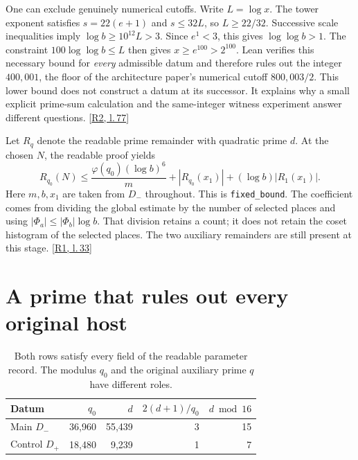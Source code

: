 \documentclass[12pt,letterpaper]{article}
\newcommand{\id}[1]{{\small\nolinkurl{#1}}}
\begin{document}
One can exclude genuinely numerical cutoffs. Write $L=\log x$. The tower exponent satisfies $s=22(e+1)$ and $s\le32L$, so $L\ge22/32$. Successive scale inequalities imply $\log b\ge10^{12}L>3$. Since $e^1<3$, this gives $\log\log b>1$. The constraint $100\log\log b\le L$ then gives $x\ge e^{100}>2^{100}$. Lean verifies this necessary bound for \emph{every} admissible datum and therefore rules out the integer $400{,}001$, the floor of the architecture paper’s numerical cutoff $800{,}003/2$. This lower bound does not construct a datum at its successor. It explains why a small explicit prime-sum calculation and the same-integer witness experiment answer different questions. {\footnotesize\sffamily\color{mute}[\href{https://github.com/leanprover-community/riemann-hypothesis/blob/e063a923620ee7787b4a1270421478645bf66bdb/src/New/Reduction/Data/AdmissibleData.lean#L77}{R2, l.\,77}]}

Let $R_q$ denote the readable prime remainder with quadratic prime $d$. At the chosen $N$, the readable proof yields
\[
 R_{q_0}(N)\leq \frac{\varphi(q_0)(\log b)^6}{m}
       +|R_{q_0}(x_1)|+(\log b)|R_1(x_1)|.
\]
Here $m,b,x_1$ are taken from $D_-$ throughout. This is \id{fixed_bound}. The coefficient comes from dividing the global estimate by the number of selected places and using $|\Phi_a|\leq |\Phi_b|\log b$. That division retains a count; it does not retain the coset histogram of the selected places. The two auxiliary remainders are still present at this stage. {\footnotesize\sffamily\color{mute}[\href{https://github.com/leanprover-community/riemann-hypothesis/blob/e063a923620ee7787b4a1270421478645bf66bdb/src/New/Reduction/OneSidedBound.lean#L33}{R1, l.\,33}]}

\section{A prime that rules out every original host}
\begin{table}[ht]\centering\small
\begin{tabular}{@{}lrrrr@{}}\toprule
Datum & $q_0$ & $d$ & $2(d+1)/q_0$ & $d\bmod 16$\\\midrule
Main $D_-$ & 36,960 & 55,439 & 3 & 15\\
Control $D_+$ & 18,480 & 9,239 & 1 & 7\\\bottomrule
\end{tabular}\caption{Both rows satisfy every field of the readable parameter record. The modulus $q_0$ and the original auxiliary prime $q$ have different roles.}\label{tab:p}
\end{table}
\end{document}
